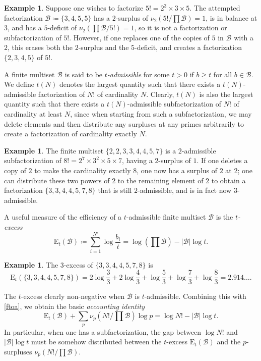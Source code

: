 \documentclass[12pt,a4paper,reqno]{amsart}
\numberwithin{equation}{section}
\theoremstyle{plain}
\theoremstyle{definition}
\newtheorem{example}[theorem]{Example}
\newcommand\tuple{{\mathcal B}}
\newcommand\excess{{\mathrm{E}}}
\begin{document}
\begin{example} Suppose one wishes to factorize $5! = 2^3 \times 3 \times 5$.  The attempted factorization ${\mathcal B} \coloneqq \{3,4,5,5\}$ has a $2$-surplus of $\nu_2(5!/\prod {\mathcal B}) = 1$, is in balance at $3$, and has a $5$-deficit of $\nu_2(\prod {\mathcal B}/5!) = 1$, so it is not a factorization or subfactorization of $5!$.  However, if one replaces one of the copies of $5$ in ${\mathcal B}$ with a $2$, this erases both the $2$-surplus and the $5$-deficit, and creates a factorization $\{2,3,4,5\}$ of $5!$.
\end{example}



A finite multiset $\tuple$ is said to be \emph{$t$-admissible} for some $t>0$ if $b \geq t$ for all $b \in \tuple$.  We define $t(N)$ denotes the largest quantity such that there exists a $t(N)$-admissible factorization of $N!$ of cardinality $N$.  Clearly, $t(N)$ is also the largest quantity such that there exists a $t(N)$-admissible subfactorization of $N!$ of cardinality at least $N$, since when starting from such a subfactorization, we may delete elements and then distribute any surpluses at any primes arbitrarily to create a factorization of cardinality exactly $N$.

\begin{example}  The finite multiset $\{2,2,3,3,4,4,5,7\}$ is a $2$-admissible subfactorization of $8! = 2^7 \times 3^2 \times 5 \times 7$, having a $2$-surplus of $1$. If one deletes a copy of $2$ to make the cardinality exactly $8$, one now has a surplus of $2$ at $2$; one can distribute these two powers of $2$ to the remaining element of $2$ to obtain a factorization $\{ 3,3,4,4,5,7,8\}$ that is still $2$-admissible, and is in fact now $3$-admissible.
\end{example}

A useful measure of the efficiency of a $t$-admissible finite multiset $\tuple$ is the \emph{$t$-excess}
$$ \excess_t(\tuple) \coloneqq \sum_{i=1}^{N'} \log \frac{b_i}{t}
= \log(\prod \tuple) - |\tuple| \log t.$$

\begin{example}  The $3$-excess of $\{ 3,3,4,4,5,7,8\}$ is
$$ \excess_t(\{3,3,4,4,5,7,8\}) = 2 \log \frac{3}{3} + 2 \log \frac{4}{3}  + \log \frac{5}{3} + \log \frac{7}{3} + \log \frac{8}{3} = 2.914\dots.$$
\end{example}

The $t$-excess clearly non-negative when $\tuple$ is $t$-admissible.
Combining this with \eqref{ftoa}, we obtain the basic \emph{accounting identity}
\begin{equation}\label{excess-identity}
\excess_t(\tuple) + \sum_p \nu_p(N!/\prod\tuple) \log p = \log N! - |\tuple| \log t.
\end{equation}
In particular, when one has a subfactorization, the gap between $\log N!$ and $|\tuple| \log t$ must be somehow distributed between the $t$-excess $\excess_t(\tuple)$ and the $p$-surpluses $\nu_p(N!/\prod\tuple)$.  
\end{document}
